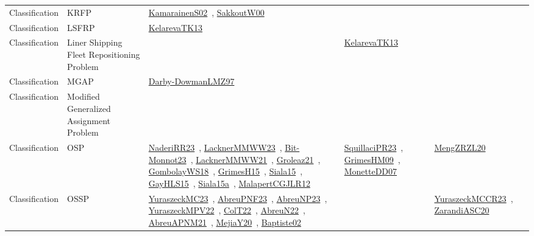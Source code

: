 {\begin{longtable}{lp{3cm}>{\raggedright\arraybackslash}p{6cm}>{\raggedright\arraybackslash}p{6cm}>{\raggedright\arraybackslash}p{8cm}}
Classification & KRFP & \href{../works/KamarainenS02.pdf}{KamarainenS02}~\cite{KamarainenS02}, \href{../works/SakkoutW00.pdf}{SakkoutW00}~\cite{SakkoutW00} &  & \\
Classification & LSFRP & \href{../works/KelarevaTK13.pdf}{KelarevaTK13}~\cite{KelarevaTK13} &  & \\
Classification & Liner Shipping Fleet Repositioning Problem &  & \href{../works/KelarevaTK13.pdf}{KelarevaTK13}~\cite{KelarevaTK13} & \\
Classification & MGAP & \href{../works/Darby-DowmanLMZ97.pdf}{Darby-DowmanLMZ97}~\cite{Darby-DowmanLMZ97} &  & \\
Classification & Modified Generalized Assignment Problem &  &  & \\
Classification & OSP & \href{../works/NaderiRR23.pdf}{NaderiRR23}~\cite{NaderiRR23}, \href{../works/LacknerMMWW23.pdf}{LacknerMMWW23}~\cite{LacknerMMWW23}, \href{../works/Bit-Monnot23.pdf}{Bit-Monnot23}~\cite{Bit-Monnot23}, \href{../works/LacknerMMWW21.pdf}{LacknerMMWW21}~\cite{LacknerMMWW21}, \href{../works/Groleaz21.pdf}{Groleaz21}~\cite{Groleaz21}, \href{../works/GombolayWS18.pdf}{GombolayWS18}~\cite{GombolayWS18}, \href{../works/GrimesH15.pdf}{GrimesH15}~\cite{GrimesH15}, \href{../works/Siala15.pdf}{Siala15}~\cite{Siala15}, \href{../works/GayHLS15.pdf}{GayHLS15}~\cite{GayHLS15}, \href{../works/Siala15a.pdf}{Siala15a}~\cite{Siala15a}, \href{../works/MalapertCGJLR12.pdf}{MalapertCGJLR12}~\cite{MalapertCGJLR12} & \href{../works/SquillaciPR23.pdf}{SquillaciPR23}~\cite{SquillaciPR23}, \href{../works/GrimesHM09.pdf}{GrimesHM09}~\cite{GrimesHM09}, \href{../works/MonetteDD07.pdf}{MonetteDD07}~\cite{MonetteDD07} & \href{../works/MengZRZL20.pdf}{MengZRZL20}~\cite{MengZRZL20}\\
Classification & OSSP & \href{../works/YuraszeckMC23.pdf}{YuraszeckMC23}~\cite{YuraszeckMC23}, \href{../works/AbreuPNF23.pdf}{AbreuPNF23}~\cite{AbreuPNF23}, \href{../works/AbreuNP23.pdf}{AbreuNP23}~\cite{AbreuNP23}, \href{../works/YuraszeckMPV22.pdf}{YuraszeckMPV22}~\cite{YuraszeckMPV22}, \href{../works/ColT22.pdf}{ColT22}~\cite{ColT22}, \href{../works/AbreuN22.pdf}{AbreuN22}~\cite{AbreuN22}, \href{../works/AbreuAPNM21.pdf}{AbreuAPNM21}~\cite{AbreuAPNM21}, \href{../works/MejiaY20.pdf}{MejiaY20}~\cite{MejiaY20}, \href{../works/Baptiste02.pdf}{Baptiste02}~\cite{Baptiste02} &  & \href{../works/YuraszeckMCCR23.pdf}{YuraszeckMCCR23}~\cite{YuraszeckMCCR23}, \href{../works/ZarandiASC20.pdf}{ZarandiASC20}~\cite{ZarandiASC20}\\

\end{longtable}}
